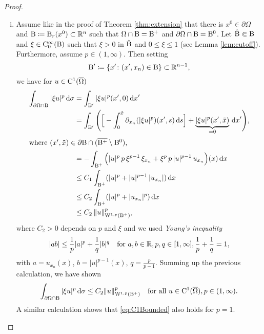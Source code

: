 \begin{proof}
  \begin{enumerate}[i)]
    \item Assume like in the proof of Theorem \ref{thm:extension} that there is $x^0 \in \partial \Omega$ and $\mathrm{B} \coloneqq \mathrm{B}_r(x^0) \subset \mathbb{R}^n$ such that $\Omega \cap \mathrm{B} = \mathrm{B}^+$ and $\partial\Omega \cap \mathrm{B} = \mathrm{B}^0$.
  Let $\hat {\mathrm{B}} \Subset \mathrm{B}$ and $\xi \in \mathrm{C}_0^\infty(\mathrm{B})$ such that $\xi > 0$ in $\hat{\mathrm{B}}$ and $0 \leq \xi \leq 1$ (see Lemma \ref{lem:cutoff}).
  Furthermore, assume $p \in (1,\infty)$.
  Then setting
  $$
  \mathrm{B}' \coloneqq \{ x' \colon (x', x_n) \in \mathrm{B} \} \subset \mathbb{R}^{n - 1},
  $$
  we have for $u \in \mathrm{C}^1(\overline\Omega)$
  \begin{align*}
    \int_{\partial\Omega \cap \mathrm{B}} |\xi u|^p \, {\operatorname{d}\!{\sigma}} 
    &= \int_{\mathrm{B}'} |\xi u|^p(x', 0) \, {\operatorname{d}\!{x}}' \nonumber\\
    &= \int_{\mathrm{B}'} \Bigg( \Big[ - \int_0^{\tilde x} \partial_{x_n} (|\xi u|^p)(x',s) \, {\operatorname{d}\!{s}} \Big] + \underbrace{|\xi u|^p (x', \tilde x)}_{= 0} \, {\operatorname{d}\!{x}}' \Bigg),\nonumber\\
    \intertext{where $(x',\tilde x) \in \partial \mathrm{B} \cap (\overline{\mathrm{B}^+} \setminus \mathrm{B}^0)$,}
    &= -\int_{\mathrm{B}^+} \Big( |u|^p \, p \, \xi^{p - 1} \, \xi_{x_n} + \xi^p \, p \, |u|^{p - 1} \, u_{x_n} \Big)(x) \, {\operatorname{d}\!{x}} \nonumber\\ 
    &\leq C_1 \int_{\mathrm{B}^+} (|u|^p + |u|^{p-1} \, |u_{x_n}| ) \, {\operatorname{d}\!{x}} \\
    &\leq C_2 \int_{\mathrm{B}^+} (|u|^p + |u_{x_n}|^p ) \, {\operatorname{d}\!{x}} \\
    &\leq C_2 \, \| u\|_{\mathrm{W}^{1,p}(\mathrm{B}^+)}^p,
  \end{align*}
      where $C_2 > 0 $ depends on $p$ and $\xi$ and we used \emph{Young's inequality}
    $$
    |a b | \leq \frac{1}{p} |a|^p + \frac{1}{q} |b|^q \quad\text{for } a,b \in \mathbb{R}, p,q \in [1,\infty], \frac{1}{p} + \frac{1}{q} = 1,
    $$
    with $a = u_{x_n}(x)$, $b = |u|^{p - 1}(x)$, $q = \frac{p}{p - 1}$.
    Summing up the previous calculation, we have shown
    \begin{equation}
      \label{eq:C1Bounded}
      \int_{\partial\Omega \cap \mathrm{B}} |\xi u|^p \, {\operatorname{d}\!{\sigma}} 
      \leq C_2 \| u\|_{\mathrm{W}^{1,p}(\mathrm{B}^+)}^p \quad\text{for all } u \in \mathrm{C}^1(\overline\Omega), p \in (1,\infty).
    \end{equation}
    A similar calculation shows that \eqref{eq:C1Bounded} also holds for $p = 1$.


\end{enumerate}
\end{proof}
